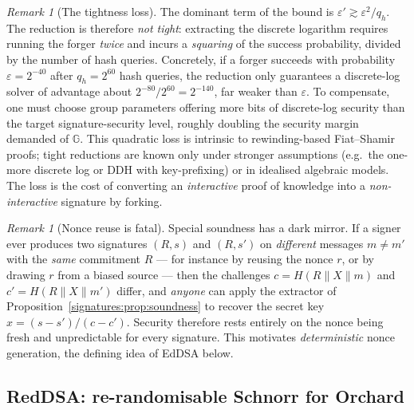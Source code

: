 \documentclass[11pt,a4paper]{article}
\theoremstyle{definition}
\theoremstyle{remark}
\newtheorem{remark}[theorem]{Remark}
\newcommand{\G}{\ensuremath{\mathbb{G}}}
\begin{document}
\begin{remark}[The tightness loss]\label{signatures:rem:tightness}
The dominant term of the bound is \(\varepsilon' \gtrsim \varepsilon^2 / q_h\). The reduction is therefore \emph{not tight}: extracting the discrete logarithm requires running the forger \emph{twice} and incurs a \emph{squaring} of the success probability, divided by the number of hash queries. Concretely, if a forger succeeds with probability \(\varepsilon = 2^{-40}\) after \(q_h = 2^{60}\) hash queries, the reduction only guarantees a discrete-log solver of advantage about \(2^{-80}/2^{60} = 2^{-140}\), far weaker than \(\varepsilon\). To compensate, one must choose group parameters offering more bits of discrete-log security than the target signature-security level, roughly doubling the security margin demanded of \(\G\). This quadratic loss is intrinsic to rewinding-based Fiat--Shamir proofs; tight reductions are known only under stronger assumptions (e.g.\ the one-more discrete log or DDH with key-prefixing) or in idealised algebraic models. The loss is the cost of converting an \emph{interactive} proof of knowledge into a \emph{non-interactive} signature by forking.
\end{remark}

\begin{remark}[Nonce reuse is fatal]\label{signatures:rem:nonce}
Special soundness has a dark mirror. If a signer ever produces two signatures \((R, s)\) and \((R, s')\) on \emph{different} messages \(m \ne m'\) with the \emph{same} commitment \(R\) — for instance by reusing the nonce \(r\), or by drawing \(r\) from a biased source — then the challenges \(c = H(R\|X\|m)\) and \(c' = H(R\|X\|m')\) differ, and \emph{anyone} can apply the extractor of Proposition~\ref{signatures:prop:soundness} to recover the secret key \(x = (s - s')/(c - c')\). Security therefore rests entirely on the nonce being fresh and unpredictable for every signature. This motivates \emph{deterministic} nonce generation, the defining idea of EdDSA below.
\end{remark}

\subsection{RedDSA: re-randomisable Schnorr for Orchard}\label{signatures:subsec:reddsa}
\end{document}
